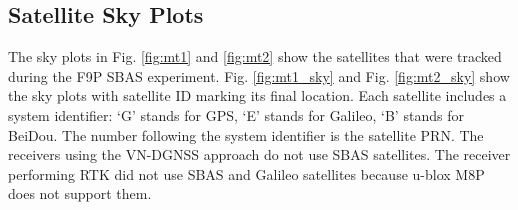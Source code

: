 \documentclass[letterpaper, 10 pt,onecolumn]{article}
\begin{document}
	
	
	
	
	\subsection{Satellite Sky Plots}
	
	The sky plots in Fig. \ref{fig:mt1} and \ref{fig:mt2} show the satellites that were tracked during the F9P SBAS experiment. 
	Fig. \ref{fig:mt1_sky} and Fig. \ref{fig:mt2_sky} show the sky plots with satellite ID marking its final location. 
	Each satellite includes a system  identifier: 
	`G' stands for GPS, 
	`E' stands for Galileo, 
	`B' stands for BeiDou. \blue 
	The number following the system identifier is the satellite PRN. \black
	\red 
	The receivers using the VN-DGNSS approach do not use SBAS satellites. 
	The receiver performing RTK did not use SBAS and Galileo satellites because u-blox M8P does not support them.
	\black
	
\end{document}
